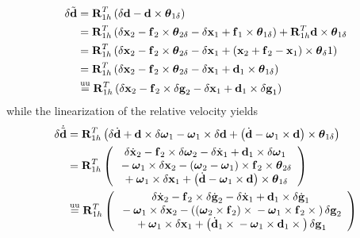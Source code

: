 \documentclass[10pt,dvips,fleqn,subeqn]{report}
\newcommand{\T}[1]{\bm{\mathbf{#1}}}
\newcommand{\equu}{\overset{\text{uu}}{=}}
\begin{document}
\begin{align}
	\delta{\tilde{\T{d}}}
	&= \T{R}_{1h}^T\plbr{
		\delta\T{d} - \T{d} \times \T{\theta}_{1\delta}
	} \nonumber \\
	&= \T{R}_{1h}^T\plbr{
		\delta{\T{x}}_2 - \T{f}_2\times\T{\theta}_{2\delta}
		- \delta{\T{x}}_1 + \T{f}_1\times\T{\theta}_{1\delta}
	} + \T{R}_{1h}^T \T{d}\times\T{\theta}_{1\delta} \nonumber \\
	&= \T{R}_{1h}^T\plbr{
		\delta{\T{x}}_2
		- \T{f}_2\times\T{\theta}_{2\delta}
		- \delta{\T{x}}_1
		+ \plbr{
			\T{x}_2
			+ \T{f}_2
			- \T{x}_1
		}\times\T{\theta}_{\delta}1
	} \nonumber \\
	&= \T{R}_{1h}^T\plbr{
		\delta{\T{x}}_2
		- \T{f}_2\times\T{\theta}_{2\delta}
		- \delta{\T{x}}_1
		+ \T{d}_1\times\T{\theta}_{1\delta}
	} \nonumber \\
	&\equu \T{R}_{1h}^T\plbr{
		\delta{\T{x}}_2
		- \T{f}_2\times\delta\T{g}_2
		- \delta{\T{x}}_1
		+ \T{d}_1\times\delta\T{g}_1
	}
\end{align}
while the linearization of the relative velocity yields
\begin{align}
	\delta\dot{\tilde{\T{d}}}
	&= \T{R}_{1h}^T\plbr{
		\delta\dot{\T{d}}
		+ \T{d} \times \delta\T{\omega}_1
		- \T{\omega}_1 \times \delta\T{d}
		+ \plbr{
			\dot{\T{d}}
			- \T{\omega}_1 \times \T{d}
		}\times\T{\theta}_{1\delta}
	} \nonumber \\
	&= \T{R}_{1h}^T\plbr{\cvvect{
		\delta\dot{\T{x}}_2
		- \T{f}_2\times\delta\T{\omega}_2
		- \delta\dot{\T{x}}_1
		+ \T{d}_1\times\delta\T{\omega}_1 \\
	\mbox{} - \T{\omega}_1 \times \delta\T{x}_2
		- \plbr{
			\T{\omega}_2 
			- \T{\omega}_1
		} \times \T{f}_2 \times\T{\theta}_{2\delta} \\
	\mbox{} + \T{\omega}_1 \times \delta\T{x}_1
		+ \plbr{
			\dot{\T{d}} - \T{\omega}_1 \times \T{d}
		} \times \T{\theta}_{1\delta}
	}} \nonumber \\
	&\equu \T{R}_{1h}^T\plbr{\cvvect{
		\delta\dot{\T{x}}_2
		- \T{f}_2\times\delta\dot{\T{g}}_2
		- \delta\dot{\T{x}}_1
		+ \T{d}_1\times\delta\dot{\T{g}}_1 \\
	\mbox{} - \T{\omega}_1 \times \delta\T{x}_2
		- \plbr{
			\plbr{\T{\omega}_2 \times \T{f}_2}\times{}
			- \T{\omega}_1 \times \T{f}_2 \times{}
		} \delta\T{g}_2 \\
	\mbox{} + \T{\omega}_1 \times \delta\T{x}_1
		+ \plbr{
			\dot{\T{d}}_1 \times{}
			- \T{\omega}_1 \times \T{d}_1\times{}
		} \delta\T{g}_1
	}}
\end{align}
\end{document}
